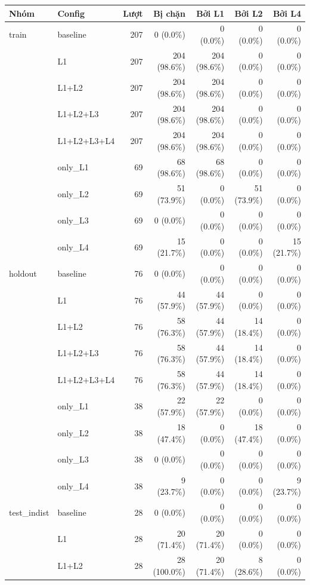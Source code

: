 \begin{tabular}{llrrrrr}
\toprule
Nhóm & Config & Lượt & Bị chặn & Bởi L1 & Bởi L2 & Bởi L4 \\
\midrule
train & baseline & 207 & 0 (0.0\%) & 0 (0.0\%) & 0 (0.0\%) & 0 (0.0\%) \\
 & L1 & 207 & 204 (98.6\%) & 204 (98.6\%) & 0 (0.0\%) & 0 (0.0\%) \\
 & L1+L2 & 207 & 204 (98.6\%) & 204 (98.6\%) & 0 (0.0\%) & 0 (0.0\%) \\
 & L1+L2+L3 & 207 & 204 (98.6\%) & 204 (98.6\%) & 0 (0.0\%) & 0 (0.0\%) \\
 & L1+L2+L3+L4 & 207 & 204 (98.6\%) & 204 (98.6\%) & 0 (0.0\%) & 0 (0.0\%) \\
 & only\_L1 & 69 & 68 (98.6\%) & 68 (98.6\%) & 0 (0.0\%) & 0 (0.0\%) \\
 & only\_L2 & 69 & 51 (73.9\%) & 0 (0.0\%) & 51 (73.9\%) & 0 (0.0\%) \\
 & only\_L3 & 69 & 0 (0.0\%) & 0 (0.0\%) & 0 (0.0\%) & 0 (0.0\%) \\
 & only\_L4 & 69 & 15 (21.7\%) & 0 (0.0\%) & 0 (0.0\%) & 15 (21.7\%) \\
\midrule
holdout & baseline & 76 & 0 (0.0\%) & 0 (0.0\%) & 0 (0.0\%) & 0 (0.0\%) \\
 & L1 & 76 & 44 (57.9\%) & 44 (57.9\%) & 0 (0.0\%) & 0 (0.0\%) \\
 & L1+L2 & 76 & 58 (76.3\%) & 44 (57.9\%) & 14 (18.4\%) & 0 (0.0\%) \\
 & L1+L2+L3 & 76 & 58 (76.3\%) & 44 (57.9\%) & 14 (18.4\%) & 0 (0.0\%) \\
 & L1+L2+L3+L4 & 76 & 58 (76.3\%) & 44 (57.9\%) & 14 (18.4\%) & 0 (0.0\%) \\
 & only\_L1 & 38 & 22 (57.9\%) & 22 (57.9\%) & 0 (0.0\%) & 0 (0.0\%) \\
 & only\_L2 & 38 & 18 (47.4\%) & 0 (0.0\%) & 18 (47.4\%) & 0 (0.0\%) \\
 & only\_L3 & 38 & 0 (0.0\%) & 0 (0.0\%) & 0 (0.0\%) & 0 (0.0\%) \\
 & only\_L4 & 38 & 9 (23.7\%) & 0 (0.0\%) & 0 (0.0\%) & 9 (23.7\%) \\
\midrule
test\_indist & baseline & 28 & 0 (0.0\%) & 0 (0.0\%) & 0 (0.0\%) & 0 (0.0\%) \\
 & L1 & 28 & 20 (71.4\%) & 20 (71.4\%) & 0 (0.0\%) & 0 (0.0\%) \\
 & L1+L2 & 28 & 28 (100.0\%) & 20 (71.4\%) & 8 (28.6\%) & 0 (0.0\%) \\

\end{tabular}
